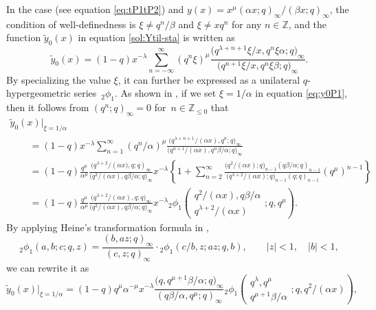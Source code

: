\documentclass[pdftex]{sigma}
\numberwithin{equation}{section}
\theoremstyle{definition}
\begin{document}
In the case  (see equation \eqref{eq:tP1tP2}) and $y(x)=x^{\mu}(\alpha x;q)_{\infty}/(\beta x;q)_{\infty} $, the condition of well-definedness is $\xi \neq q^n/\beta $ and $\xi \neq x q^n $ for any $n \in \mathbb{Z}$, and the function $\widetilde{y}_0(x)$ in equation \eqref{sol:Ytil-sta} is written as
\begin{equation} \label{eq:y0P1}
\widetilde{y}_0(x) = (1 - q) x^{-\lambda} \sum_{n = -\infty}^{\infty} (q^n \xi)^{\mu} \frac{\bigl(q^{\lambda + n + 1} \xi/x, q^n \xi \alpha ;q\bigr)_{\infty}}{\bigl(q^{n + 1} \xi/x, q^n \xi \beta ;q\bigr)_{\infty}}.
\end{equation}
By specializing the value $\xi$, it can further be expressed as a unilateral $q$-hypergeometric series~${_2 \phi_1}$.
As shown in \cite{AT}, if we set $\xi =1 /\alpha $ in equation \eqref{eq:y0P1}, then it follows from $(q^n;q)_{\infty}=0$ for~${n\in \mathbb{Z}_{\le 0}}$ that
\begin{gather*}
\widetilde{y}_0(x) |_{\xi=1/\alpha }\\
\qquad = (1-q) x^{-\lambda} \sum_{n=1}^{\infty}(q^n/\alpha)^{\mu} \frac{\bigl(q^{\lambda+n+1}/(\alpha x),q^n;q\bigr)_{\infty}}{\bigl(q^{n+1}/(\alpha x),q^n\beta/\alpha;q\bigr)_{\infty}} \\
\qquad= (1-q)\frac{q^{\mu}}{\alpha^{\mu}} \frac{\bigl(q^{\lambda+2}/(\alpha x\bigr), q;q)_{\infty}}{\bigl(q^2/(\alpha x), q\beta/\alpha ;q\bigr)_{\infty}} x^{-\lambda}
\left\{ 1+ \sum_{n=2}^{\infty} \frac{\bigl(q^{2}/(\alpha x);q\bigr) _{n-1} (q \beta/\alpha;q)_{n-1}}{\bigl(q^{\lambda+2}/(\alpha x);q\bigr) _{n-1} (q ;q)_{n-1}} (q^{\mu})^{n-1} \right\} \\
\qquad = (1-q)\frac{q^{\mu}}{\alpha^{\mu}}\frac{\bigl(q^{\lambda+2}/(\alpha x),q;q\bigr)_{\infty}}{\bigl(q^2/(\alpha x),q\beta/\alpha;q\bigr)_{\infty}} x^{-\lambda } {}_2\phi_1 \left( \begin{matrix} q^2/(\alpha x), q\beta/\alpha\\ q^{\lambda+2}/(\alpha x) \end{matrix} ;q,q^{\mu} \right).
\end{gather*}
By applying Heine's transformation formula in \cite[equation~(1.4.1)]{GR},
\[
{}_2\phi_1 (a,b;c;q,z)= \frac{(b,az;q)_{\infty}}{(c,z;q)_{\infty}}  \cdot {}_2\phi_1 (c/b,z;az; q,b), \qquad |z|<1, \quad |b|<1,
\]
 we can rewrite it as
\begin{equation} \label{eq:y0al}
\widetilde{y}_0(x) |_{\xi=1/\alpha }
= (1-q) q^{\mu} \alpha^{-\mu} x^{-\lambda} \frac{\bigl(q, q^{\mu+1}\beta/\alpha ;q\bigr)_{\infty}}{(q\beta/\alpha,q^{\mu} ;q)_{\infty}}
{}_2\phi_1 \left( \begin{matrix} q^{\lambda},q^{\mu}\\
q^{\mu+1}\beta/\alpha \end{matrix} ;q, q^2/(\alpha x) \right),
\end{equation}
\end{document}
